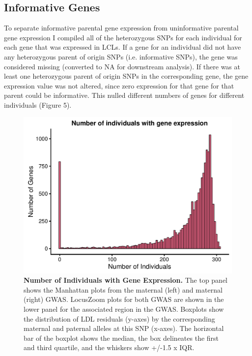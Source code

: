 \subsection{Informative Genes}\label{Informative Genes}
To separate informative parental gene expression from uninformative parental gene expression I compiled all of the heterozygous SNPs for each individual for each gene that was expressed in LCLs. If a gene for an individual did not have any heterozygous parent of origin SNPs (i.e. informative SNPs), the gene was considered missing (converted to NA for downstream analysis). If there was at least one heterozygous parent of origin SNPs in the corresponding gene, the gene expression value was not altered, since zero expression for that gene for that parent could be informative. This nulled different numbers of genes for different individuals (Figure 5).



\begin{figure}[!htb]
\centering \includegraphics[width=6in]{img/ch04/fig-05-individualspergene.pdf}
\caption[Number of Individuals with Gene Expression.]{\textbf{Number of Individuals with Gene Expression.}  The top panel shows the Manhattan plots from the maternal (left) and maternal (right) GWAS. LocusZoom plots for both GWAS are shown in the lower panel for the associated region in the GWAS. Boxplots show the distribution of LDL residuals (y-axes) by the corresponding maternal and paternal alleles at this SNP (x-axes). The horizontal bar of the boxplot shows the median, the box delineates the first and third quartile, and the whiskers show +/-1.5 x IQR.}
\label{fig:ldl_mpgwas}
\end{figure}



